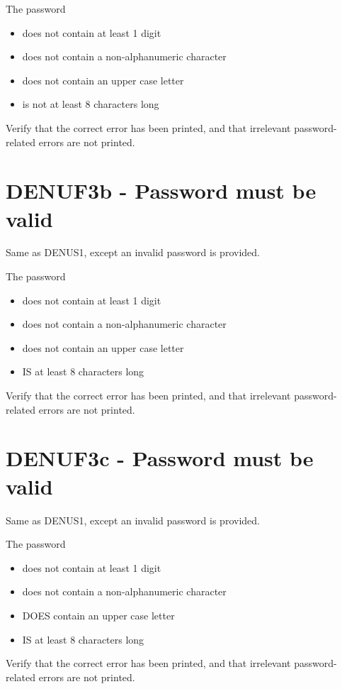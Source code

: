 \documentclass{article}
\begin{document}
The password 
\begin{itemize}
 \item does not contain at least 1 digit
 \item does not contain a non-alphanumeric character
 \item does not contain an upper case letter
 \item is not at least 8 characters long
\end{itemize}

Verify that the correct error has been printed, and that
irrelevant password-related errors are not printed.

\section*{DENUF3b - Password must be valid}

Same as DENUS1, except an invalid password is provided.

The password
\begin{itemize}
  \item does not contain at least 1 digit
  \item does not contain a non-alphanumeric character
  \item does not contain an upper case letter
  \item IS at least 8 characters long
\end{itemize}

Verify that the correct error has been printed, and that
irrelevant password-related errors are not printed.

\section*{DENUF3c - Password must be valid}

Same as DENUS1, except an invalid password is provided.

The password
\begin{itemize}
  \item does not contain at least 1 digit
  \item does not contain a non-alphanumeric character
  \item DOES contain an upper case letter
  \item IS at least 8 characters long
\end{itemize}

Verify that the correct error has been printed, and that
irrelevant password-related errors are not printed.
\end{document}
